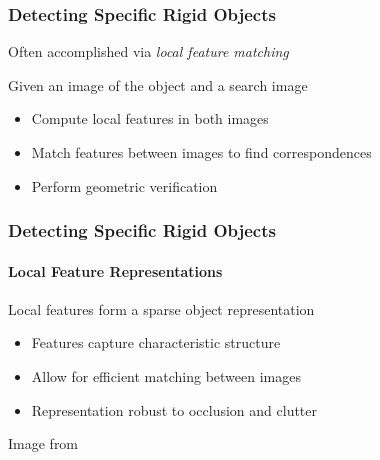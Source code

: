 \documentclass[xetex,professionalfont]{beamer}
\begin{document}
\begin{frame}
\frametitle{Detecting Specific Rigid Objects}

Often accomplished via \emph{local feature matching}

\bigskip
Given an image of the object and a search image
\begin{itemize}
    \item Compute local features in both images
    \item Match features between images to find correspondences
    \item Perform geometric verification %
\end{itemize}

\end{frame}


\begin{frame}
\frametitle{Detecting Specific Rigid Objects}
\framesubtitle{Local Feature Representations}

Local features form a sparse object representation
\begin{itemize}
    \item Features capture characteristic structure
    \item Allow for efficient matching between images
    \item Representation robust to occlusion and clutter %
\end{itemize}

\begin{center}
    {\centering Image from \cite{grauman2011}}
\end{center}

\end{frame}

\end{document}
